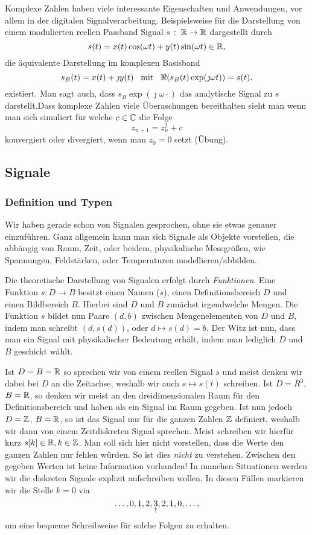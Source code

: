 Komplexe Zahlen haben viele interessante Eigenschaften und Anwendungen, vor allem in der digitalen Signalverarbeitung.
Beispielsweise f\"ur die Darstellung von einem modulierten reellen Passband Signal $s \hspace{0.5mm}:\hspace{1.0mm} \mathbb{R} \rightarrow \mathbb{R}$ dargestellt durch
\[
s(t) = x(t)\cos(\omega t) + y(t)\sin(\omega t) \in \mathbb{R},
\]
die \"aquivalente Darstellung im komplexen Basisband
\[
s_B(t) = x(t) + \jmath y(t) {\hspace{3mm} \text{mit} \hspace{3mm}} \Re(s_B(t)\exp(\jmath \omega t)) = s(t).
\]
existiert. Man sagt auch, dass $s_B \exp(\jmath \omega \cdot)$ das analytische Signal zu $s$ darstellt.Dass komplexe Zahlen viele \"Uberaschungen bereithalten sieht man wenn man sich simuliert f\"ur welche $c \in \mathbb{C}$ die Folge
\[
z_{n+1} = z_{n}^2 + c
\]
konvergiert oder divergiert, wenn man $z_0 = 0$ setzt (\"Ubung). 
%
%
\subsection{Signale}
%
\subsubsection{Definition und Typen}
%
Wir haben gerade schon von Signalen gesprochen, ohne sie etwas genauer einzuf\"uhren. 
Ganz allgemein kann man sich Signale als Objekte vorstellen, die abh\"angig von Raum, Zeit, oder beidem, physikalische Messgr\"o\ss{}en, wie Spannungen, Feldst\"arken, oder Temperaturen modellieren/abbilden.

Die theoretische Darstellung von Signalen erfolgt durch \emph{Funktionen}.
Eine Funktion $s : D \rightarrow B$ besitzt einen Namen ($s$), einen Definitionsbereich $D$ und einen Bildbereich $B$.
Hierbei sind $D$ und $B$ zun\"achst irgendwelche Mengen. 
Die Funktion $s$ bildet nun Paare $(d,b)$ zwischen Mengenelementen von $D$ und $B$, indem man schreibt $(d, s(d))$, oder $d \mapsto s(d) = b$.
Der Witz ist nun, dass man ein Signal mit physikalischer Bedeutung erh\"alt, indem man lediglich $D$ und $B$ geschickt w\"ahlt.

Ist $D = B = \mathbb{R}$ so sprechen wir von einem reellen Signal $s$ und meist denken wir dabei bei $D$ an die Zeitachse, weshalb wir auch $s \mapsto s(t)$ schreiben. 
Ist $D = R^3$, $B = \mathbb{R}$, so denken wir meist an den dreidimensionalen Raum f\"ur den Definitionsbereich und haben als ein Signal im Raum gegeben.
Ist nun jedoch $D = \mathbb{Z}$, $B = \mathbb{R}$, so ist das Signal nur f\"ur die ganzen Zahlen $\mathbb{Z}$ definiert, weshalb wir dann von einem Zeitdiskreten Signal sprechen.
Meist schreiben wir hierf\"ur kurz $s[k] \in \mathbb{R}, k\in \mathbb{Z}$.
Man soll sich hier nicht vorstellen, dass die Werte  den ganzen Zahlen nur fehlen w\"urden. 
So ist dies \emph{nicht} zu verstehen. 
Zwischen den gegeben Werten ist keine Information vorhanden!
In manchen Situationen werden wir die diskreten Signale explizit aufschreiben wollen. 
In diesen F\"allen markieren wir die Stelle $k = 0$ via
\[
\dots, 0, 1, 2, \underset{\uparrow}{3}, 2, 1, 0, \dots,
\]
um eine bequeme Schreibweise f\"ur solche Folgen zu erhalten. 

